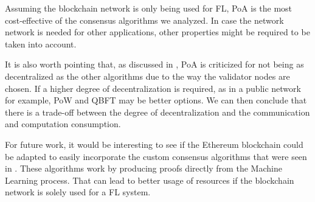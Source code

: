 Assuming the blockchain network is only being used for FL, PoA is the most cost-effective of the consensus algorithms we analyzed. In case the network network is needed for other applications, other properties might be required to be taken into account.

It is also worth pointing that, as discussed in , PoA is criticized for not being as decentralized as the other algorithms due to the way the validator nodes are chosen. If a higher degree of decentralization is required, as in a public network for example, PoW and QBFT may be better options. We can then conclude that there is a trade-off between the degree of decentralization and the communication and computation consumption.

For future work, it would be interesting to see if the Ethereum blockchain could be adapted to easily incorporate the custom consensus algorithms that were seen in . These algorithms work by producing proofs directly from the Machine Learning process. That can lead to better usage of resources if the blockchain network is solely used for a FL system.